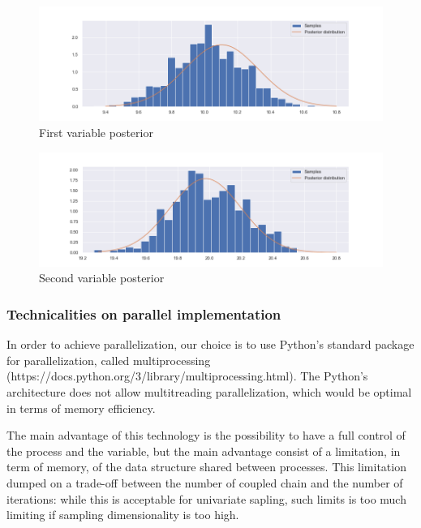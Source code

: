 \documentclass {article}
\begin{document}
\begin{figure}[h!]
	\centering
	\includegraphics[width=\textwidth]{immagini_coupling_multivariate/coupling_mult_histogram_1}	
	\caption{First variable posterior}
\end{figure}
\begin{figure}[h!]
	\centering
	\includegraphics[width=\textwidth]{immagini_coupling_multivariate/coupling_mult_histogram_2}
	\caption{Second variable posterior}
\end{figure}

\clearpage

\subsubsection{Technicalities on parallel implementation}

In order to achieve parallelization, our choice is to use Python's standard package for parallelization, called multiprocessing (https://docs.python.org/3/library/multiprocessing.html). The Python's architecture does not allow multitreading parallelization, which would be optimal in terms of memory efficiency.

The main advantage of this technology is the possibility to have a full control of the process and the variable, but the main advantage consist of a limitation, in term of memory, of the data structure shared between processes. This limitation dumped on a trade-off between the number of coupled chain and the number of iterations: while this is acceptable for univariate sapling, such limits is too much limiting if sampling dimensionality is too high.
\end{document}
